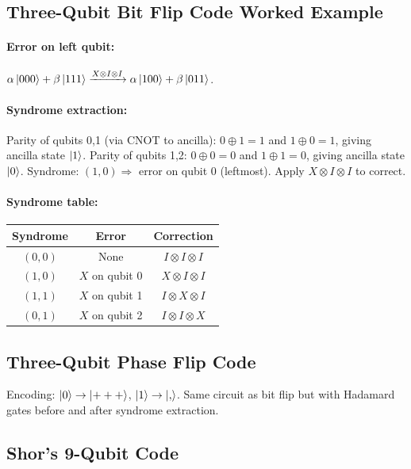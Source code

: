 \documentclass[10pt,a4paper]{article}
\begin{document}
\subsection{Three-Qubit Bit Flip Code Worked Example}

\paragraph{Error on left qubit:} $\alpha\ket{000}+\beta\ket{111}\xrightarrow{X\otimes I\otimes I}\alpha\ket{100}+\beta\ket{011}$.

\paragraph{Syndrome extraction:}
Parity of qubits 0,1 (via CNOT to ancilla): $0\oplus 1=1$ and $1\oplus 0=1$, giving ancilla state $\ket{1}$.
Parity of qubits 1,2: $0\oplus 0=0$ and $1\oplus 1=0$, giving ancilla state $\ket{0}$.
Syndrome: $(1,0)\Rightarrow$ error on qubit 0 (leftmost). Apply $X\otimes I\otimes I$ to correct.

\paragraph{Syndrome table:}
\begin{center}
\begin{tabular}{ccc}
Syndrome & Error & Correction \\
\hline
$(0,0)$ & None & $I\otimes I\otimes I$ \\
$(1,0)$ & $X$ on qubit 0 & $X\otimes I\otimes I$ \\
$(1,1)$ & $X$ on qubit 1 & $I\otimes X\otimes I$ \\
$(0,1)$ & $X$ on qubit 2 & $I\otimes I\otimes X$ \\
\end{tabular}
\end{center}

\subsection{Three-Qubit Phase Flip Code}

Encoding: $\ket{0}\to\ket{+++}$, $\ket{1}\to\ket{, }$. Same circuit as bit flip but with Hadamard gates before and after syndrome extraction.

\subsection{Shor's 9-Qubit Code}
\end{document}
